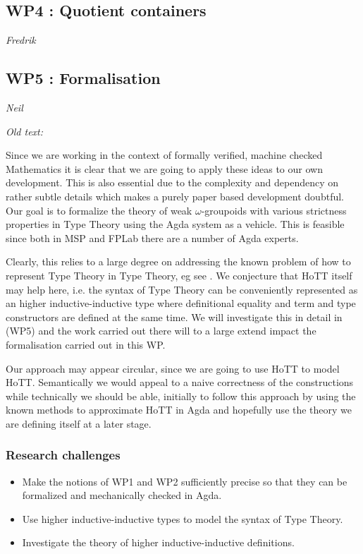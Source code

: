\documentclass[twocolumn,a4paper,11pt]{article}
\begin{document}
\subsection*{WP4 : Quotient containers} 

\emph{Fredrik}

\subsection*{WP5 : Formalisation} 

\emph{Neil}

\emph{Old text:}

Since we are working in the context of formally verified, machine
checked Mathematics it is clear that we are going to apply these ideas
to our own development. This is also essential due to the complexity
and dependency on rather subtle details which makes a purely paper
based development doubtful. Our goal is to formalize the theory of
weak $\omega$-groupoids with various strictness properties in Type
Theory using the Agda system as a vehicle. This is feasible since both
in MSP and FPLab there are a number of Agda experts. 

Clearly, this relies to a large degree on addressing the known problem
of how to represent Type Theory in Type Theory, eg see
\cite{Chapman:tteat}.  We conjecture that HoTT itself may help here,
i.e. the syntax of Type Theory can be conveniently represented as an
higher inductive-inductive type where definitional equality and term
and type constructors are defined at the same time. We will
investigate this in detail in (WP5) and the work carried out there
will to a large extend impact the formalisation carried out in this
WP.


Our approach may appear circular, since we are going to use HoTT to
model HoTT. Semantically we would appeal to a naive correctness of the
constructions while technically we should be able, initially to follow
this approach by using the known methods to approximate HoTT in Agda
\cite{LicatasTrick}  and hopefully use the theory we are defining
itself at a later stage. 

\subsubsection*{Research challenges}

\begin{itemize}
\item Make the notions of WP1 and WP2 sufficiently precise so that they
  can be formalized and mechanically checked in Agda.

\item Use higher inductive-inductive types to model the syntax of Type
  Theory. 

\item Investigate the theory of higher inductive-inductive
  definitions.

\end{itemize}
\end{document}
